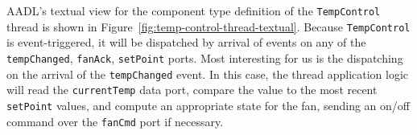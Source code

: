AADL's textual view for the component type definition of the \texttt{TempControl}
thread is shown in Figure~\ref{fig:temp-control-thread-textual}.
Because \texttt{TempControl} is event-triggered, it will be dispatched
by arrival of events on any of the \texttt{tempChanged}, \texttt{fanAck}, 
\texttt{setPoint} ports.  Most interesting for us is the dispatching on the 
arrival of the \texttt{tempChanged} event.  In this case, the 
thread application logic will read the \texttt{currentTemp} data port, 
compare the value to the most recent \texttt{setPoint} values, and
compute an appropriate state for the fan, sending an on/off command
over the \texttt{fanCmd} port if necessary.




